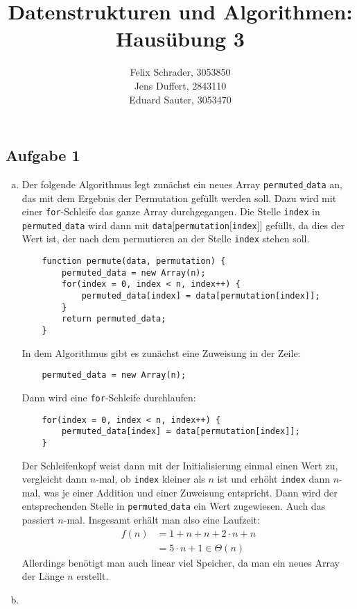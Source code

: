 \documentclass[11pt]{article}
\author{
  Felix Schrader, 3053850 \\ 
  Jens Duffert, 2843110 \\
  Eduard Sauter, 3053470
}
\title{Datenstrukturen und Algorithmen: Haus\"ubung 3}
\begin{document}
\maketitle
\subsection*{Aufgabe 1}
\begin{enumerate}[a)]
\item
  Der folgende Algorithmus legt zunächst ein neues Array
  \texttt{permuted$\_$data} an, das mit dem Ergebnis der Permutation gefüllt
  werden soll. Dazu wird mit einer \texttt{for}-Schleife das ganze Array
  durchgegangen. Die Stelle \texttt{index} in \texttt{permuted$\_$data} wird
  dann mit \texttt{data$\lbrack$permutation$\lbrack$index$\rbrack\rbrack$}
  gefüllt, da dies der Wert ist, der nach dem permutieren an der Stelle
  \texttt{index} stehen soll.
  \begin{lstlisting}
    function permute(data, permutation) {
        permuted_data = new Array(n);
        for(index = 0, index < n, index++) {
            permuted_data[index] = data[permutation[index]];
        }
        return permuted_data;
    }
  \end{lstlisting}
  In dem Algorithmus gibt es zunächst eine Zuweisung in der Zeile:
  \begin{lstlisting}
    permuted_data = new Array(n);
  \end{lstlisting}
  Dann wird eine \texttt{for}-Schleife durchlaufen:
  \begin{lstlisting}
    for(index = 0, index < n, index++) {
        permuted_data[index] = data[permutation[index]];
    }
  \end{lstlisting}
  Der Schleifenkopf weist dann mit der Initialisierung einmal einen Wert zu,
  vergleicht dann $n$-mal, ob \texttt{index} kleiner als $n$ ist und erhöht
  \texttt{index} dann $n$-mal, was je einer Addition und einer Zuweisung
  entspricht. Dann wird der entsprechenden Stelle in \texttt{permuted$\_$data}
  ein Wert zugewiesen. Auch das passiert $n$-mal. Insgesamt erhält man also
  eine Laufzeit:
  \begin{align*}
    f (n) &= 1 + n + n + 2 \cdot n + n
    \\ &= 5 \cdot n + 1 \in \Theta (n)
  \end{align*}
  Allerdings benötigt man auch linear viel Speicher, da man ein neues Array der
  Länge $n$ erstellt.
\item 
\end{enumerate}
\end{document}
